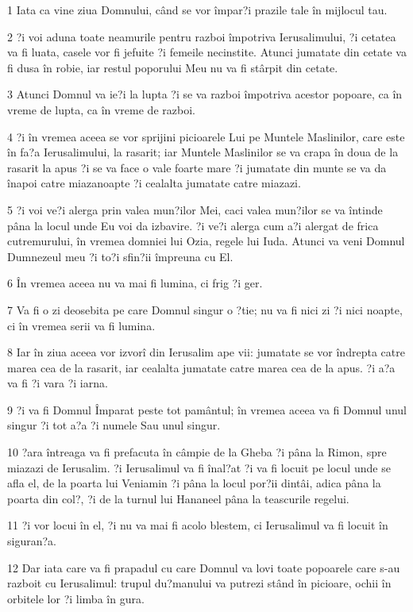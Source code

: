 \par 1 Iata ca vine ziua Domnului, când se vor împar?i prazile tale în mijlocul tau.
\par 2 ?i voi aduna toate neamurile pentru razboi împotriva Ierusalimului, ?i cetatea va fi luata, casele vor fi jefuite ?i femeile necinstite. Atunci jumatate din cetate va fi dusa în robie, iar restul poporului Meu nu va fi stârpit din cetate.
\par 3 Atunci Domnul va ie?i la lupta ?i se va razboi împotriva acestor popoare, ca în vreme de lupta, ca în vreme de razboi.
\par 4 ?i în vremea aceea se vor sprijini picioarele Lui pe Muntele Maslinilor, care este în fa?a Ierusalimului, la rasarit; iar Muntele Maslinilor se va crapa în doua de la rasarit la apus ?i se va face o vale foarte mare ?i jumatate din munte se va da înapoi catre miazanoapte ?i cealalta jumatate catre miazazi.
\par 5 ?i voi ve?i alerga prin valea mun?ilor Mei, caci valea mun?ilor se va întinde pâna la locul unde Eu voi da izbavire. ?i ve?i alerga cum a?i alergat de frica cutremurului, în vremea domniei lui Ozia, regele lui Iuda. Atunci va veni Domnul Dumnezeul meu ?i to?i sfin?ii împreuna cu El.
\par 6 În vremea aceea nu va mai fi lumina, ci frig ?i ger.
\par 7 Va fi o zi deosebita pe care Domnul singur o ?tie; nu va fi nici zi ?i nici noapte, ci în vremea serii va fi lumina.
\par 8 Iar în ziua aceea vor izvorî din Ierusalim ape vii: jumatate se vor îndrepta catre marea cea de la rasarit, iar cealalta jumatate catre marea cea de la apus. ?i a?a va fi ?i vara ?i iarna.
\par 9 ?i va fi Domnul Împarat peste tot pamântul; în vremea aceea va fi Domnul unul singur ?i tot a?a ?i numele Sau unul singur.
\par 10 ?ara întreaga va fi prefacuta în câmpie de la Gheba ?i pâna la Rimon, spre miazazi de Ierusalim. ?i Ierusalimul va fi înal?at ?i va fi locuit pe locul unde se afla el, de la poarta lui Veniamin ?i pâna la locul por?ii dintâi, adica pâna la poarta din col?, ?i de la turnul lui Hananeel pâna la teascurile regelui.
\par 11 ?i vor locui în el, ?i nu va mai fi acolo blestem, ci Ierusalimul va fi locuit în siguran?a.
\par 12 Dar iata care va fi prapadul cu care Domnul va lovi toate popoarele care s-au razboit cu Ierusalimul: trupul du?manului va putrezi stând în picioare, ochii în orbitele lor ?i limba în gura.
